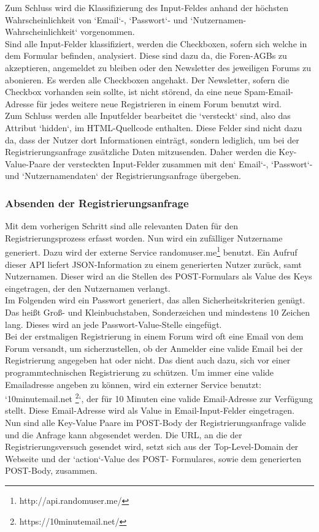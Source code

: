 Zum Schluss wird die Klassifizierung des Input-Feldes anhand der höchsten Wahrscheinlichkeit von `Email`-, `Passwort`- und `Nutzernamen-Wahrscheinlichkeit` vorgenommen. \\
Sind alle Input-Felder klassifiziert, werden die Checkboxen, sofern sich welche in dem Formular befinden, analysiert. Diese sind dazu da, die Foren-AGBs zu akzeptieren, angemeldet zu bleiben oder den Newsletter des jeweiligen Forums zu abonieren.
Es werden alle Checkboxen angehakt. Der Newsletter, sofern die Checkbox vorhanden sein sollte, ist nicht störend, da eine neue Spam-Email-Adresse für jedes weitere neue Registrieren in einem Forum benutzt wird.\\
Zum Schluss werden alle Inputfelder bearbeitet die `versteckt` sind, also das Attribut `hidden`, im HTML-Quellcode enthalten.
Diese Felder sind nicht dazu da, dass der Nutzer dort Informationen einträgt, sondern lediglich, um bei der Registrierungsanfrage zusätzliche Daten mitzusenden. Daher werden die Key-Value-Paare der versteckten Input-Felder zusammen mit den` Email`-, `Passwort`- und `Nutzernamendaten` der Registrierungsanfrage übergeben.

\subsubsection{Absenden der Registrierungsanfrage}
Mit dem vorherigen Schritt sind alle relevanten Daten für den Registrierungsprozess erfasst worden. Nun wird ein zufälliger Nutzername generiert. Dazu wird der externe Service randomuser.me\footnote{http://api.randomuser.me/} benutzt. Ein Aufruf dieser API liefert JSON-Information zu einem generierten Nutzer zurück, samt Nutzernamen. Dieser wird an die Stellen des POST-Formulars als Value des Keys eingetragen, der den Nutzernamen verlangt.\\
Im Folgenden wird ein Passwort generiert, das allen Sicherheitskriterien genügt. Das heißt Groß- und Kleinbuchstaben, Sonderzeichen und mindestens 10 Zeichen lang. Dieses wird an jede Passwort-Value-Stelle eingefügt.\\
Bei der erstmaligen Registrierung in einem Forum wird oft eine Email von dem Forum versandt, um sicherzustellen, ob der Anmelder eine valide Email bei der Registrierung angegeben hat oder nicht. Das dient auch dazu, sich vor einer programmtechnischen Registrierung zu schützen. Um immer eine valide Emailadresse angeben zu können, wird ein externer Service benutzt: `10minutemail.net \footnote{https://10minutemail.net/}`, der für 10 Minuten eine valide Email-Adresse zur Verfügung stellt. Diese Email-Adresse wird als Value in Email-Input-Felder eingetragen.\\
Nun sind alle Key-Value Paare im POST-Body der Registrierungsanfrage valide und die Anfrage kann abgesendet werden.
Die URL, an die der Registrierungsversuch gesendet wird, setzt sich aus der Top-Level-Domain der Webseite und der `action`-Value des POST- Formulares, sowie dem generierten POST-Body, zusammen.

